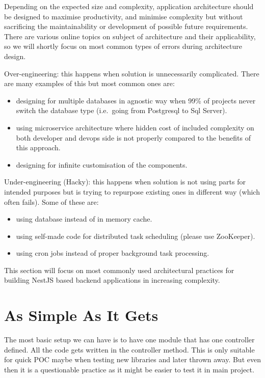 Depending on the expected size and complexity, application architecture should be designed to maximise productivity,
and minimise complexity but without sacrificing the maintainability or development of possible future requirements.
There are various online topics on subject of architecture and their applicability, so we will shortly focus on most
common types of errors during architecture design.

Over-engineering: this happens when solution is unnecessarily complicated.
There are many examples of this but most common ones are:
\begin{itemize}
  \item designing for multiple databases in agnostic way when 99\% of projects never switch the database type (i.e.\ going from Postgresql to Sql Server).
  \item using microservice architecture where hidden cost of included complexity on both developer and devops side is not
  properly compared to the benefits of this approach.
  \item designing for infinite customisation of the components.
\end{itemize}

Under-engineering (Hacky): this happens when solution is not using parts for intended purposes but is trying to repurpose
existing ones in different way (which often fails).
Some of these are:
\begin{itemize}
  \item using database instead of in memory cache.
  \item using self-made code for distributed task scheduling (please use ZooKeeper).
  \item using cron jobs instead of proper background task processing.
\end{itemize}


This section will focus on most commonly used architectural practices for building NestJS based backend applications
in increasing complexity.

\section{As Simple As It Gets}\label{sec:arch-as-simple-as-it-gets}

The most basic setup we can have is to have one module that has one controller defined.
All the code gets written in the controller method.
This is only suitable for quick POC maybe when testing new libraries and later thrown away.
But even then it is a questionable practice as it might be easier to test it in main project.

